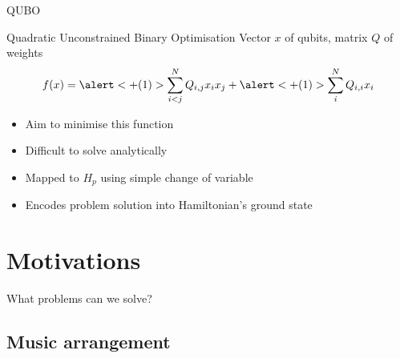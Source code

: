 \documentclass[handout]{beamer}
\begin{document}
\begin{frame}{QUBO}
    \pause
    \begin{block}{Quadratic Unconstrained Binary Optimisation}
        \vspace{0.1em}
        Vector $x$ of qubits, matrix $Q$ of weights
        \begin{equation*}
            f(x)=\alert<+(1)>{\sum^N_{i<j}Q_{i,j}x_ix_j} + \alert<+(1)>{\sum^N_iQ_{i,i}x_i}
        \end{equation*}
    \end{block}
    \pause
    \begin{itemize}
        \item Aim to minimise this function
        \item Difficult to solve analytically
        \item Mapped to $H_p$ using simple change of variable
        \item Encodes problem solution into Hamiltonian's ground state
    \end{itemize}

\end{frame}

\section{Motivations}

\begin{frame}[standout]
    What problems can we solve?
\end{frame}

\subsection{Music arrangement}
\end{document}
